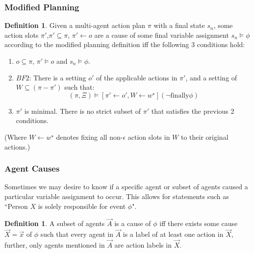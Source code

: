 \documentclass{article}
\theoremstyle{plain}
\theoremstyle{definition}
\newtheorem{defn}[thm]{Definition} %
\begin{document}
\subsubsection*{Modified Planning}
\begin{defn}
Given a multi-agent action plan $\pi$ with a final state $s_n$, some action slots $\pi'$,$\pi' \subseteq \pi$, $\pi' \leftarrow o$ are a cause of some final variable assignment $s_n \models \phi$ according to the modified planning definition iff the following 3 conditions hold:
\begin{enumerate}
\item  $o \subseteq \pi$, $\pi' \models o$ and $s_n \models \phi$.
\item $BF2$: There is a setting $o'$ of the applicable actions in $\pi'$, and a setting of $W \subseteq (\pi  - \pi')$ such that:
\[
(\pi, \Xi) \models [\pi' \leftarrow o', W \leftarrow w^\star](\lnot \textrm{finally} \phi)
\]
\item $\pi'$ is minimal. There is no strict subset of $\pi'$ that satisfies the previous 2 conditions.
\end{enumerate}


(Where $W\leftarrow w^\star$ denotes fixing all non-$\epsilon$ action slots in $W$ to their original actions.)

\end{defn}

\subsubsection*{Agent Causes}
Sometimes we may desire to know if a specific agent or subset of agents caused a particular variable assignment to occur. This allows for statements such as ``Person $X$ is solely responsible for event $\phi$".
\begin{defn}
A subset of agents $\vec{A}$ is a cause of $\phi$ iff there exists some cause $\vec{X}=\vec{x}$ of $\phi$ such that every agent in $\vec{A}$ is a label of at least one action in $\vec{X}$, further, only agents mentioned in $\vec{A}$ are action labels in $\vec{X}$.
\end{defn}
\end{document}
